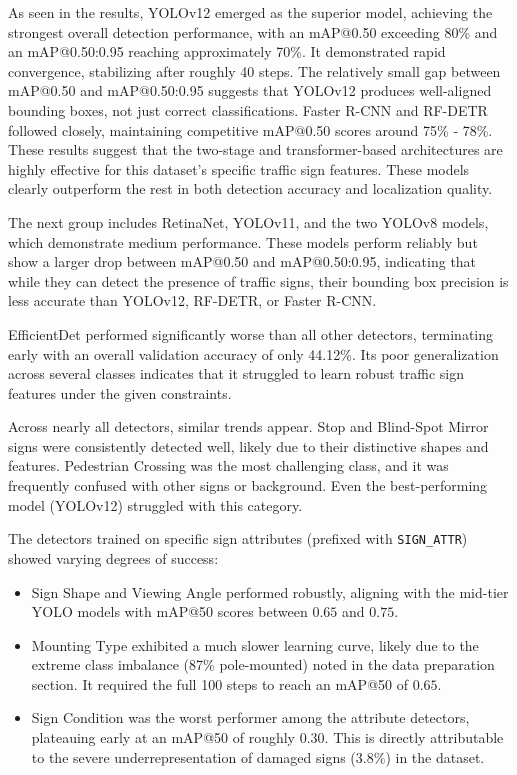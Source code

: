 \documentclass{article}
\begin{document}
As seen in the results, YOLOv12 emerged as the superior model, achieving the strongest overall detection performance, with an mAP@0.50 exceeding 80\% and an mAP@0.50:0.95 reaching approximately 70\%. It demonstrated rapid convergence, stabilizing after roughly 40 steps. The relatively small gap between mAP@0.50 and mAP@0.50:0.95 suggests that YOLOv12 produces well-aligned bounding boxes, not just correct classifications. Faster R-CNN and RF-DETR followed closely, maintaining competitive mAP@0.50 scores around 75\% - 78\%. These results suggest that the two-stage and transformer-based architectures are highly effective for this dataset's specific traffic sign features. These models clearly outperform the rest in both detection accuracy and localization quality.

The next group includes RetinaNet, YOLOv11, and the two YOLOv8 models, which demonstrate medium performance. These models perform reliably but show a larger drop between mAP@0.50 and mAP@0.50:0.95, indicating that while they can detect the presence of traffic signs, their bounding box precision is less accurate than YOLOv12, RF-DETR, or Faster R-CNN.

EfficientDet performed significantly worse than all other detectors, terminating early with an overall validation accuracy of only 44.12\%. Its poor generalization across several classes indicates that it struggled to learn robust traffic sign features under the given constraints.

Across nearly all detectors, similar trends appear. Stop and Blind-Spot Mirror signs were consistently detected well, likely due to their distinctive shapes and features. Pedestrian Crossing was the most challenging class, and it was frequently confused with other signs or background. Even the best-performing model (YOLOv12) struggled with this category.

The detectors trained on specific sign attributes (prefixed with \texttt{SIGN\_ATTR}) showed varying degrees of success:

\begin{itemize}
    \item Sign Shape and Viewing Angle performed robustly, aligning with the mid-tier YOLO models with mAP@50 scores between $0.65$ and $0.75$.
    \item Mounting Type exhibited a much slower learning curve, likely due to the extreme class imbalance (87\% pole-mounted) noted in the data preparation section. It required the full 100 steps to reach an mAP@50 of $0.65$.
    \item Sign Condition was the worst performer among the attribute detectors, plateauing early at an mAP@50 of roughly $0.30$. This is directly attributable to the severe underrepresentation of damaged signs ($3.8\%$) in the dataset.
\end{itemize}
\end{document}
